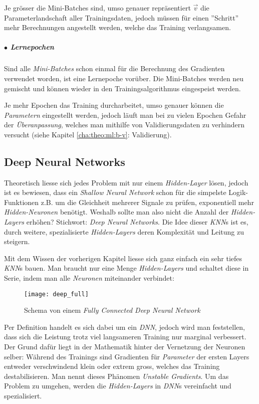 Je grösser die Mini-Batches sind, umso genauer repräsentiert $\vec{v}$ die Parameterlandschaft aller Trainingsdaten, jedoch müssen für einen ''Schritt'' mehr Berechnungen angestellt werden, welche das Training verlangsamen.


\subparagraph{$\bullet$ Lernepochen} Sind alle \textit{Mini-Batches} schon einmal für die Berechnung des Gradienten verwendet worden, ist eine Lernepoche vorüber. Die Mini-Batches werden neu gemischt und können wieder in den Trainingsalgorithmus eingespeist werden.

Je mehr Epochen das Training durcharbeitet, umso genauer können die \textit{Parametern} eingestellt werden, jedoch läuft man bei zu vielen Epochen Gefahr der \textit{Überanpassung}, welches man mithilfe von Validierungsdaten zu verhindern versucht (siehe Kapitel \ref{cha:theo:ml:b-v}: Validierung).


\subsection[DNNs]{Deep Neural Networks}\label{cha:theo:dl}
Theoretisch liesse sich jedes Problem mit nur einem \textit{Hidden-Layer} lösen, jedoch ist es bewiesen, dass ein \textit{Shallow Neural Network} schon für die simpelste Logik-Funktionen z.B. um die Gleichheit mehrerer Signale zu prüfen, exponentiell mehr \textit{Hidden-Neuronen} benötigt\cite{hastad}. Weshalb sollte man also nicht die Anzahl der \textit{Hidden-Layers} erhöhen? Stichwort: \textit{Deep Neural Networks}. Die Idee dieser \textit{KNN}s ist es, durch weitere, spezialisierte \textit{Hidden-Layers} deren Komplexität und Leitung zu steigern.

Mit dem Wissen der vorherigen Kapitel liesse sich ganz einfach ein sehr tiefes \textit{KNN}s bauen. Man braucht nur eine Menge \textit{Hidden-Layers} und schaltet diese in Serie, indem man alle \textit{Neuronen} miteinander verbindet:

\begin{figure}[h]
	\centering
	\texttt{[image: deep\_full]}
	\caption[\textit{Fully Connected Deep Neural Network}]{Schema von einem \textit{Fully Connected Deep Neural Network}}
	\label{img:deep_full}
\end{figure}

Per Definition handelt es sich dabei um ein \textit{DNN}, jedoch wird man feststellen, dass sich die Leistung trotz viel langsameren Training nur marginal verbessert. Der Grund dafür liegt in der Mathematik hinter der Vernetzung der Neuronen selber: Während des Trainings sind Gradienten für \textit{Parameter} der ersten Layers entweder verschwindend klein oder extrem gross, welches das Training destabilisieren. Man nennt dieses Phänomen \textit{Unstable Gradients}. Um das Problem zu umgehen, werden die \textit{Hidden-Layers} in \textit{DNN}s vereinfacht und spezialisiert. \\


